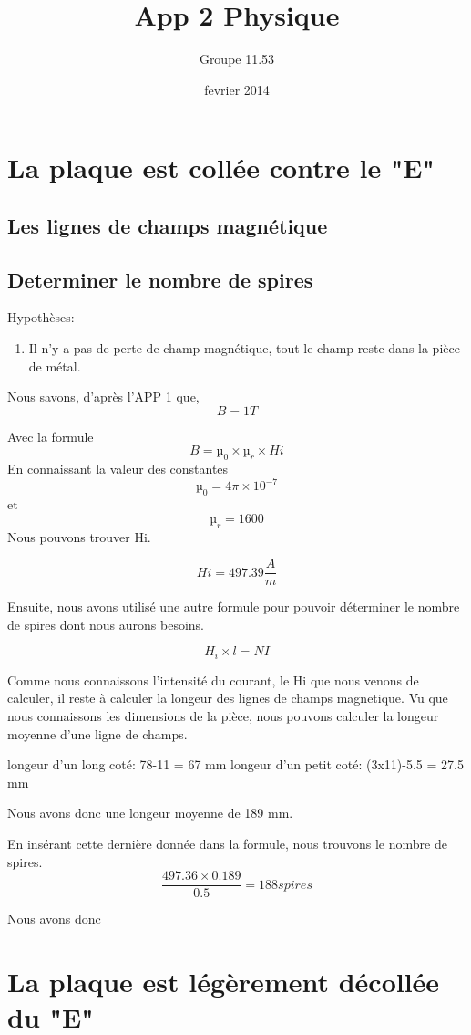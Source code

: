 \documentclass{report}
\title{App 2  Physique}
\author{Groupe 11.53}
\date{fevrier 2014}
\begin{document}
 
\maketitle

\chapter{La plaque est collée contre le "E"}
\section{Les lignes de champs magnétique}

\section{Determiner le nombre de spires}

Hypothèses: 
\begin{enumerate}
\item Il n'y a pas de perte de champ magnétique, tout le champ reste dans la pièce de métal.
\end{enumerate}

Nous savons, d'après l'APP 1 que, \[B = 1T\] 

Avec la formule \[B = µ_{0} \times µ_{r} \times Hi\]  En connaissant la valeur des constantes  \[µ_{0} = 4\pi \times 10^{-7}\] et \[µ_{r} = 1600 \] Nous pouvons trouver Hi.

\[ Hi = 497.39 \frac{A}{m}\]

Ensuite, nous avons utilisé une autre formule pour pouvoir déterminer le nombre de spires dont nous aurons besoins.

\[H_{i} \times l = N I\]

Comme nous connaissons l'intensité du courant, le Hi que nous venons de calculer, il reste à calculer la longeur des lignes de champs magnetique.  Vu que nous connaissons les dimensions de la pièce, nous pouvons calculer la longeur moyenne d'une ligne de champs.  

\medbreak longeur d'un long coté: 78-11 = 67 mm
\medbreak longeur d'un petit coté: (3x11)-5.5 = 27.5 mm

\bigbreak Nous avons donc une longeur moyenne de 189 mm.

En insérant cette dernière donnée dans la formule, nous trouvons le nombre de spires. 
\[\frac{497.36 \times 0.189}{0.5} = 188 spires\]

Nous avons donc 
\chapter{La plaque est légèrement décollée du "E"}
\end{document}
